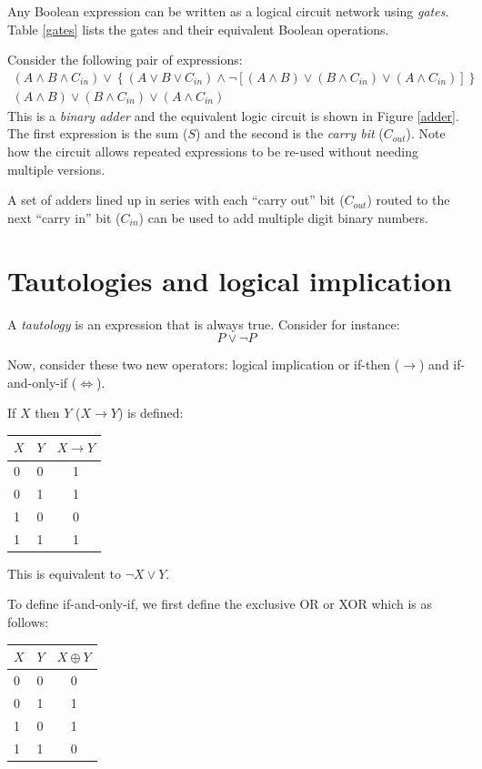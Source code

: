 \documentclass{article}
\begin{document}
Any Boolean expression can be written as a logical circuit network using
{\it gates}.
Table \ref{gates} lists the gates and their equivalent Boolean operations. 

Consider the following pair of expressions:
\begin{eqnarray}
	(A \land B \land C_{in}) \lor \left \lbrace (A \lor B \lor C_{in}) \land \lnot \left [(A \land B) \lor (B \land C_{in}) \lor (A \land C_{in}) \right ] \right \rbrace \\
	(A \land B) \lor (B \land C_{in}) \lor (A \land C_{in})
\end{eqnarray}
This is a {\it binary adder} and the equivalent logic circuit is shown
in Figure \ref{adder}.
The first expression is the sum ($S$) and the second is the {\it carry bit} ($C_{out}$).
Note how the circuit allows repeated expressions to be re-used without
needing multiple versions.

A set of adders lined up in series with each ``carry out'' bit ($C_{out}$)
routed to the next ``carry in'' bit ($C_{in}$) can be used to add multiple
digit binary numbers.


\section{Tautologies and logical implication}

A {\it tautology} is an expression that is always true.
Consider for instance:
\begin{equation}
	P \lor \lnot P
\end{equation}

Now, consider these two new operators: logical implication 
or if-then ($\rightarrow$) and if-and-only-if ($\iff$).

If $X$ then $Y$ ($X \rightarrow Y$) is defined:

\begin{tabular}{ll|c}
	$X$ & $Y$ & $X \rightarrow Y$ \\
	\hline
	0 & 0 & 1 \\
	0 & 1 & 1 \\
	1 & 0 & 0 \\
	1 & 1 & 1 \\
\end{tabular}

This is equivalent to $\lnot X \lor Y$.

To define if-and-only-if, we first define the exclusive OR or XOR 
which is as follows:

\begin{tabular}{ll|c}
	$X$ & $Y$ & $X \oplus Y$ \\
	\hline
	0 & 0 & 0 \\
	0 & 1 & 1 \\
	1 & 0 & 1 \\
	1 & 1 & 0 \\
\end{tabular}
\end{document}
